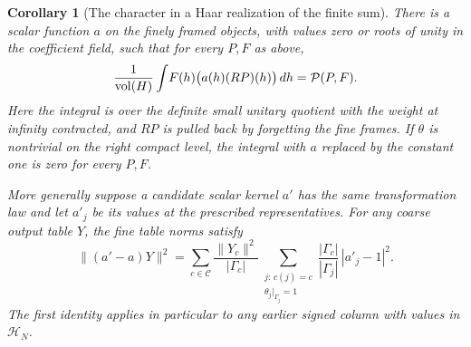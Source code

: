\documentclass[a4paper,11pt]{article}
\newtheorem{corollary}[proposition]{Corollary}
\theoremstyle{definition}
\theoremstyle{remark}
\numberwithin{equation}{section}
\begin{document}
\begin{corollary}[The character in a Haar realization of the finite sum]
\leavevmode\label{cor:rowhaar380}
There is a scalar function \(a\) on the finely framed objects,
with values zero or roots of unity in the coefficient field,
such that for every \(P,F\) as above,
\[
 \frac{1}{\operatorname{vol}(H)}
      \int \! F(h)\bigl(a(h)(RP)(h)\bigr)\,dh
                    ={\cal P}(P,F).
\]
Here the integral is over the definite small unitary quotient
with the weight at infinity contracted, and \(RP\) is pulled
back by forgetting the fine frames. If \(\theta\) is nontrivial
on the right compact level, the integral with \(a\) replaced
by the constant one is zero for every \(P,F\).

More generally suppose a candidate scalar kernel \(a'\) has
the same transformation law and let \(a'_j\) be its values
at the prescribed representatives. For any coarse output table
\(Y\), the fine table norms satisfy
\[
 \|(a'-a)Y\|^2
   =\sum_{c\in\mathcal C}\frac{\|Y_c\|^2}{|\Gamma_c|}
      \sum_{\substack{j:\,c(j)=c\\ \theta_j|_{\Gamma_j}=1}}
          \frac{|\Gamma_c|}{|\Gamma_j|}\,|a'_j-1|^2 .
\]
The first identity applies in particular to any earlier signed
column with values in \(\mathcal H_N\).
\end{corollary}
\end{document}
